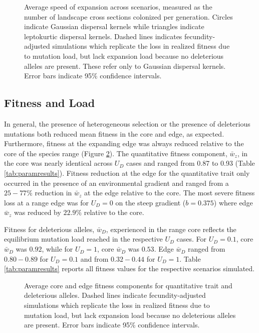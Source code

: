 \begin{figure}[h]
\centering
{}
\caption[Average speed of expansion.]{Average speed of expansion across scenarios, measured as the number of landscape cross sections colonized per generation. Circles indicate Gaussian dispersal kernels while triangles indicate leptokurtic dispersal kernels. Dashed lines indicates fecundity-adjusted simulations which replicate the loss in realized fitness due to mutation load, but lack expansion load because no deleterious alleles are present. These refer only to Gaussian dispersal kernels. Error bars indicate 95\% confidence intervals.}
\label{fig:speed}
\end{figure}




\subsection*{Fitness and Load}

In general, the presence of heterogeneous selection or the presence of deleterious mutations both reduced mean fitness in the core and edge, as expected. Furthermore, fitness at the expanding edge was always reduced relative to the core of the species range (Figure \ref{fig:fitness}). The quantitative fitness component, $\bar{w}_z$, in the core was nearly identical across $U_D$ cases and ranged from 0.87 to 0.93 (Table \ref{tab:paramresults}). Fitness reduction at the edge for the quantitative trait only occurred in the presence of an environmental gradient and ranged from a $25-77\%$ reduction in $\bar{w}_z$ at the edge relative to the core. The most severe fitness loss at a range edge was for $U_D = 0$ on the steep gradient ($b = 0.375$) where edge $\bar{w}_z$ was reduced by $22.9\%$ relative to the core.

Fitness for deleterious alleles, $\bar{w}_D$, experienced in the range core reflects the equilibrium mutation load reached in the respective $U_D$ cases. For  $U_D = 0.1$, core $\bar{w}_D$ was $0.92$, while for $U_D = 1$, core $\bar{w}_D$ was $0.53$. Edge $\bar{w}_D$ ranged from $0.80-0.89$ for $U_D = 0.1$ and from $0.32-0.44$ for $U_D = 1$. Table \ref{tab:paramresults} reports all fitness values for the respective scenarios simulated.


\begin{figure}[h]
\centering
{}
\caption[Average core and edge fitness.]{Average core and edge fitness components for quantitative trait and deleterious alleles. Dashed lines indicate fecundity-adjusted simulations which replicate the loss in realized fitness due to mutation load, but lack expansion load because no deleterious alleles are present. Error bars indicate 95\% confidence intervals.}
\label{fig:fitness}
\end{figure}


